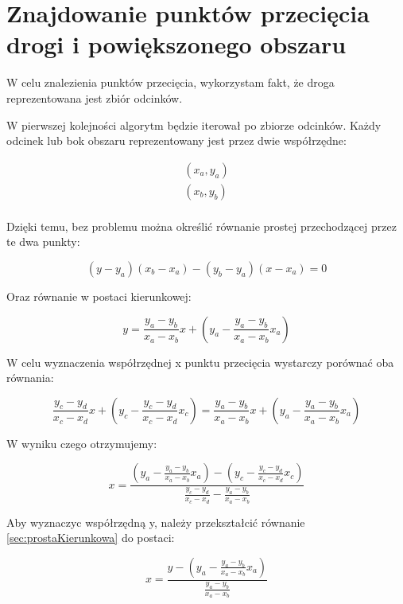 \newpage
\section{Znajdowanie punktów przecięcia drogi i powiększonego obszaru}

W celu znalezienia punktów przecięcia, wykorzystam fakt, że droga reprezentowana jest zbiór odcinków.

W pierwszej kolejności algorytm będzie iterował po zbiorze odcinków. Każdy odcinek lub bok obszaru reprezentowany jest przez dwie współrzędne:

\begin{equation}
\begin{split}
(x_a, y_a) \\
(x_b, y_b) \\
\end{split}
\end{equation}

Dzięki temu, bez problemu można określić równanie prostej przechodzącej przez te dwa punkty:

\begin{equation}
(y - y_a) (x_b-x_a) - (y_b - y_a) (x - x_a) = 0
\end{equation}

Oraz równanie w postaci kierunkowej:

\begin{equation} \label{sec:prostaKierunkowa}
y=\frac{y_a - y_b}{x_a - x_b}x + (y_a - \frac{y_a - y_b}{x_a - x_b}x_a)
\end{equation}

W celu wyznaczenia współrzędnej x punktu przecięcia wystarczy porównać oba równania:

\begin{equation}
\frac{y_c - y_d}{x_c - x_d}x + (y_c - \frac{y_c - y_d}{x_c - x_d}x_c)=\frac{y_a - y_b}{x_a - x_b}x + (y_a - \frac{y_a - y_b}{x_a - x_b}x_a)
\end{equation}

W wyniku czego otrzymujemy:

\begin{equation}
x = \frac{(y_a - \frac{y_a - y_b}{x_a - x_b}x_a) - (y_c - \frac{y_c - y_d}{x_c - x_d}x_c)}{\frac{y_c - y_d}{x_c - x_d} - \frac{y_a - y_b}{x_a - x_b}}
\end{equation}

Aby wyznaczyc współrzędną y, należy przekształcić równanie \ref{sec:prostaKierunkowa} do postaci:

\begin{equation}
x=\frac{y - (y_a - \frac{y_a - y_b}{x_a - x_b}x_a)}{\frac{y_a - y_b}{x_a - x_b}}
\end{equation}

